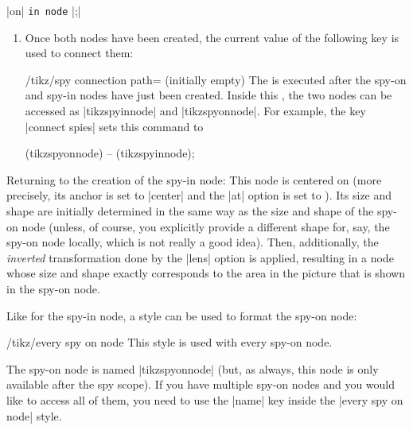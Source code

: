 \begin{command}{\spy {} |on|  \texttt{in node} |;|}
\begin{enumerate}
\begin{codeexample}[preamble={\usetikzlibrary{decorations.fractals,spy}}]
\end{codeexample}
        \item Once both nodes have been created, the current value of the
            following key is used to connect them:
            \begin{key}{/tikz/spy connection path= (initially \normalfont empty)}
                The  is executed after the spy-on and spy-in nodes
                have just been created. Inside this , the two nodes
                can be accessed as |tikzspyinnode| and  |tikzspyonnode|. For
                example, the key |connect spies| sets this command to
\begin{codeexample}
\draw[thin] (tikzspyonnode) -- (tikzspyinnode);
\end{codeexample}
            \end{key}
    \end{enumerate}
    Returning to the creation of the spy-in node: This node is centered on
     (more precisely, its anchor is set to |center| and the
    |at| option is set to ). Its size and shape are initially
    determined in the same way as the size and shape of the spy-on node
    (unless, of course, you explicitly provide a different shape for, say, the
    spy-on node locally, which is not really a good idea). Then, additionally,
    the \emph{inverted} transformation done by the |lens| option is applied,
    resulting in a node whose size and shape exactly corresponds to the area in
    the picture that is shown in the spy-on node.
\begin{codeexample}[preamble={\usetikzlibrary{decorations.fractals,spy}}]
\end{codeexample}

    Like for the spy-in node, a style can be used to format the spy-on node:
    \begin{stylekey}{/tikz/every spy on node}
        This style is used with every spy-on node.
    \end{stylekey}
    The spy-on node is named |tikzspyonnode| (but, as always, this node is only
    available after the spy scope). If you have multiple spy-on nodes and you
    would like to access all of them, you need to use the |name| key inside the
    |every spy on node| style.


\end{command}
